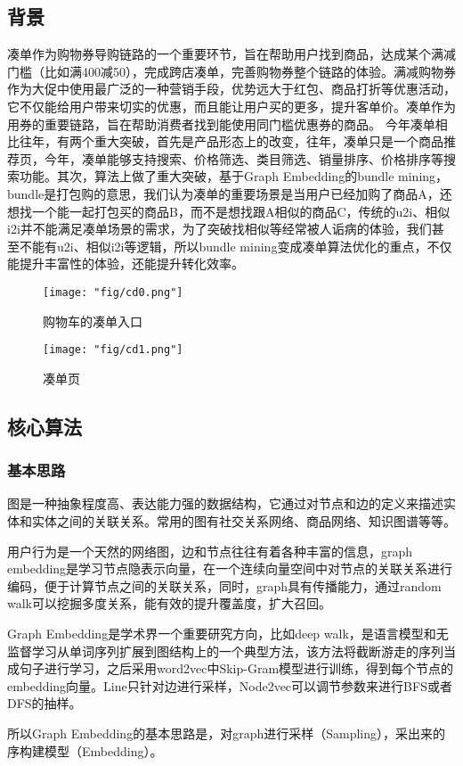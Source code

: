 \subsection{背景}
凑单作为购物券导购链路的一个重要环节，旨在帮助用户找到商品，达成某个满减门槛（比如满400减50），完成跨店凑单，完善购物券整个链路的体验。满减购物券作为大促中使用最广泛的一种营销手段，优势远大于红包、商品打折等优惠活动，它不仅能给用户带来切实的优惠，而且能让用户买的更多，提升客单价。凑单作为用券的重要链路，旨在帮助消费者找到能使用同门槛优惠券的商品。
今年凑单相比往年，有两个重大突破，首先是产品形态上的改变，往年，凑单只是一个商品推荐页，今年，凑单能够支持搜索、价格筛选、类目筛选、销量排序、价格排序等搜索功能。其次，算法上做了重大突破，基于Graph Embedding的bundle mining，bundle是打包购的意思，我们认为凑单的重要场景是当用户已经加购了商品A，还想找一个能一起打包买的商品B，而不是想找跟A相似的商品C，传统的u2i、相似i2i并不能满足凑单场景的需求，为了突破找相似等经常被人诟病的体验，我们甚至不能有u2i、相似i2i等逻辑，所以bundle mining变成凑单算法优化的重点，不仅能提升丰富性的体验，还能提升转化效率。


\begin{figure}[!h]
\begin{minipage}[t]{0.5\linewidth}
\centering
\texttt{[image: "fig/cd0.png"]}
\caption{购物车的凑单入口}
\label{fig:cd0}
\end{minipage}%
\begin{minipage}[t]{0.5\linewidth}
\centering
\texttt{[image: "fig/cd1.png"]}
\caption{凑单页}
\label{fig:cd1}
\end{minipage}
\end{figure}


\subsection{核心算法}
\subsubsection{基本思路}
图是一种抽象程度高、表达能力强的数据结构，它通过对节点和边的定义来描述实体和实体之间的关联关系。常用的图有社交关系网络、商品网络、知识图谱等等。
\par 用户行为是一个天然的网络图，边和节点往往有着各种丰富的信息，graph embedding是学习节点隐表示向量，在一个连续向量空间中对节点的关联关系进行编码，便于计算节点之间的关联关系，同时，graph具有传播能力，通过random walk可以挖掘多度关系，能有效的提升覆盖度，扩大召回。
\par Graph Embedding是学术界一个重要研究方向，比如deep walk，是语言模型和无监督学习从单词序列扩展到图结构上的一个典型方法，该方法将截断游走的序列当成句子进行学习，之后采用word2vec中Skip-Gram模型进行训练，得到每个节点的embedding向量。Line只针对边进行采样，Node2vec可以调节参数来进行BFS或者DFS的抽样。
\par 所以Graph Embedding的基本思路是，对graph进行采样（Sampling），采出来的序构建模型（Embedding）。

